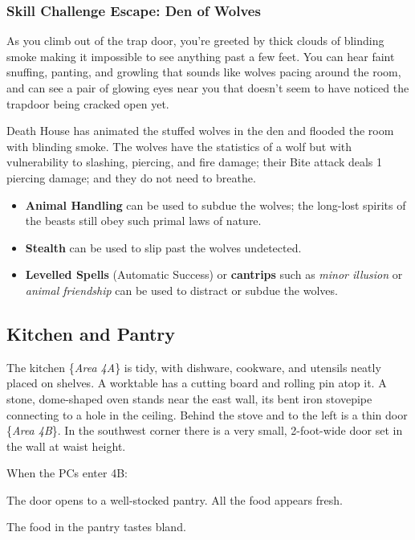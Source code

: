 \subsubsection*{Skill Challenge Escape: Den of Wolves}
\label{sec:SC_DenOfWolves}
\begin{readout}
  As you climb out of the trap door, you're greeted by thick clouds of blinding smoke making it impossible to
  see anything past a few feet. You can hear faint snuffing, panting, and growling that sounds like wolves
  pacing around the room, and can see a pair of glowing eyes near you that doesn't seem to have noticed the
  trapdoor being cracked open yet.
\end{readout}
Death House has animated the stuffed wolves in the den and flooded the room with blinding smoke. The wolves have
the statistics of a wolf but with vulnerability to slashing, piercing, and fire damage; their Bite attack deals
1 piercing damage; and they do not need to breathe.
\begin{skillChallenge}
  \begin{itemize}
    \item \textbf{Animal Handling} can be used to subdue the wolves; the long-lost spirits of the beasts still
    obey such primal laws of nature. \moderateDC
    \item \textbf{Stealth} can be used to slip past the wolves undetected. \easyDC
    \item \textbf{Levelled Spells} (Automatic Success) or \textbf{cantrips} \moderateDC such as
    \textit{minor illusion} or \textit{animal friendship} can be used to distract or subdue the wolves.
  \end{itemize}
\end{skillChallenge}


\pagebreak
\subsection{Kitchen and Pantry}
\label{sec:KitchenAndPantry}
\begin{readout}
  The kitchen \{\textit{Area 4A}\} is tidy, with dishware, cookware, and utensils neatly placed on shelves.
  A worktable has a cutting board and rolling pin atop it. A stone, dome-shaped oven stands near the east wall,
  its bent iron stovepipe connecting to a hole in the ceiling. Behind the stove and to the left is a thin door
  \{\textit{Area 4B}\}. In the southwest corner there is a very small, 2-foot-wide door set in the wall 
  at waist height.
\end{readout}
When the PCs enter 4B:
\begin{readout}
  The door opens to a well-stocked pantry. All the food appears fresh.
\end{readout}
The food in the pantry tastes bland.

